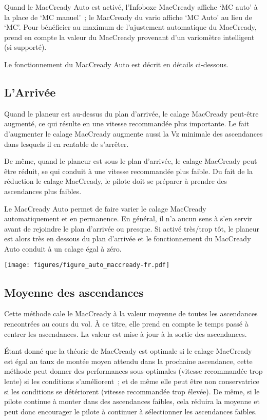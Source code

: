 Quand le MacCready Auto est activé, l'Infoboxe MacCready affiche `MC auto' à la place de `MC manuel'~; le MacCready du vario affiche `MC Auto' au lieu de `MC'.
Pour bénéficier au maximum de l'ajustement automatique du MacCready, \xc{} prend en compte la valeur du MacCready provenant d'un variomètre intelligent (si supporté).

Le fonctionnement du MacCready Auto est décrit en détails ci-dessous.


\subsection*{L'Arrivée}

Quand le planeur est au-dessus du plan d'arrivée, le calage MacCready peut-être augmenté, ce qui résulte en une vitesse recommandée plus importante.
Le fait d'augmenter le calage MacCready augmente aussi la Vz minimale des ascendances dans lesquels il en rentable de s'arrêter.

De même, quand le planeur est sous le plan d'arrivée, le calage MacCready peut être réduit, se qui conduit à une vitesse recommandée plus faible.
Du fait de la réduction le calage MacCready, le pilote doit se préparer à prendre des ascendances plus faibles.

Le MacCready Auto permet de faire varier le calage MacCready automatiquement et en permanence. En général, il n'a aucun sens à s'en servir avant de rejoindre le plan d'arrivée ou presque.
Si activé très/trop tôt, le planeur est alors très en dessous du plan d'arrivée et le fonctionnement du MacCready Auto conduit à un calage égal à zéro.

\begin{maxipage}
\begin{center}
\texttt{[image: figures/figure\_auto\_maccready-fr.pdf]}
\end{center}
\end{maxipage}


\subsection*{Moyenne des ascendances}

Cette méthode cale le MacCready à la valeur moyenne de toutes les ascendances rencontrées au cours du vol.
À ce titre, elle prend en compte le temps passé à centrer les ascendances.
La valeur est mise à jour à la sortie des ascendances.

Étant donné que la théorie de MacCready est optimale si le calage MacCready est égal au taux de montée moyen attendu dans la prochaine ascendance, cette méthode peut donner des performances sous-optimales (vitesse recommandée trop lente) si les conditions s'améliorent~; et de même elle peut être non conservatrice si les conditions se détériorent (vitesse recommandée trop élevée).
De même, si le pilote continue à monter dans des ascendances faibles, cela réduira la moyenne et peut donc encourager le pilote à continuer à sélectionner les ascendances faibles.

